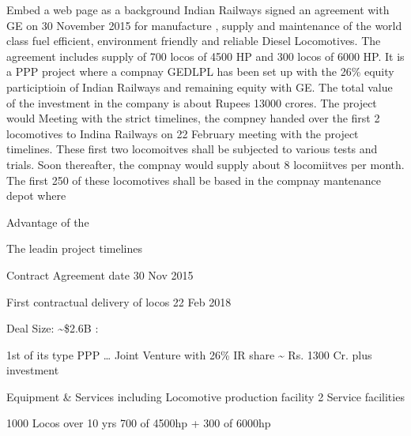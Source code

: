 \documentclass[
  ignorenonframetext,
]{beamer}
\begin{document}
\begin{frame}{Embed a web page as a background}
\protect\hypertarget{embed-a-web-page-as-a-background}{}
Indian Railways signed an agreement with GE on 30 November 2015 for
manufacture , supply and maintenance of the world class fuel efficient,
environment friendly and reliable Diesel Locomotives. The agreement
includes supply of 700 locos of 4500 HP and 300 locos of 6000 HP. It is
a PPP project where a compnay GEDLPL has been set up with the 26\%
equity participtioin of Indian Railways and remaining equity with GE.
The total value of the investment in the company is about Rupees 13000
crores. The project would Meeting with the strict timelines, the compney
handed over the first 2 locomotives to Indina Railways on 22 February
meeting with the project timelines. These first two locomoitves shall be
subjected to various tests and trials. Soon thereafter, the compnay
would supply about 8 locomiitves per month. The first 250 of these
locomotives shall be based in the compnay mantenance depot where

Advantage of the
\end{frame}

\begin{frame}{The leadin project timelines}
\protect\hypertarget{the-leadin-project-timelines}{}
\end{frame}

\begin{frame}{Contract Agreement date 30 Nov 2015}
\protect\hypertarget{contract-agreement-date-30-nov-2015}{}
\begin{block}{First contractual delivery of locos 22 Feb 2018}
\protect\hypertarget{first-contractual-delivery-of-locos-22-feb-2018}{}
\end{block}
\end{frame}

\begin{frame}{Deal Size: \textasciitilde\$2.6B :}
\protect\hypertarget{deal-size-2.6b}{}
\begin{block}{1st of its type PPP \ldots{} Joint Venture with 26\% IR
share \textasciitilde{} Rs. 1300 Cr. plus investment}
\protect\hypertarget{st-of-its-type-ppp-joint-venture-with-26-ir-share-rs.-1300-cr.-plus-investment}{}
\end{block}
\end{frame}

\begin{frame}{Equipment \& Services including Locomotive production
facility 2 Service facilities}
\protect\hypertarget{equipment-services-including-locomotive-production-facility-2-service-facilities}{}
\begin{block}{1000 Locos over 10 yrs 700 of 4500hp + 300 of 6000hp}
\protect\hypertarget{locos-over-10-yrs-700-of-4500hp-300-of-6000hp}{}
\end{block}
\end{frame}
\end{document}
